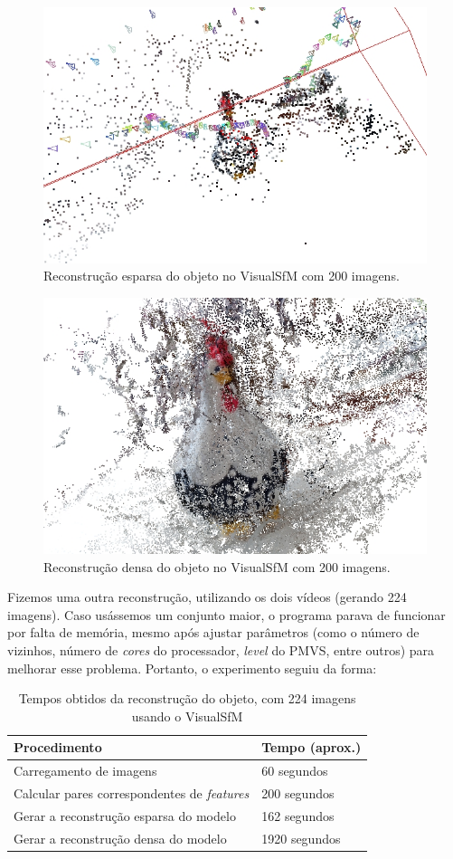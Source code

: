 \begin{figure}[!h]
	\centering
	\includegraphics[width=0.3\linewidth]{figs/galinhasparsa.jpg}
	\caption{%
	Reconstrução esparsa do objeto no VisualSfM com 200 imagens.
	}\label{fig:reconstrucaoEsparsaVisualSFM}
\end{figure}

\begin{figure}[!h]
	\centering
	\includegraphics[width=0.3\linewidth]{figs/galinhadense.jpg}
	\caption{%
	Reconstrução densa do objeto no VisualSfM com 200 imagens.
	}\label{fig:reconstrucaoDensaVisualSFM}
\end{figure}

Fizemos uma outra reconstrução, utilizando os dois vídeos (gerando 224 imagens). Caso usássemos um conjunto maior, o programa parava de funcionar por falta de memória, mesmo após ajustar parâmetros (como o número de vizinhos, número de \emph{cores} do processador, \emph{level} do PMVS, entre outros) para melhorar esse problema. Portanto, o experimento seguiu da forma:

\begin{table}[h!]
\caption{Tempos obtidos da reconstrução do objeto, com 224 imagens usando o VisualSfM}
\label{tab:temposSfM224}
\begin{tabular}{|l|p{4.7cm}|}
\hline
Procedimento & Tempo (aprox.) \\ \hline
Carregamento de imagens & 60 segundos \\ \hline
Calcular pares correspondentes de \emph{features} & 200 segundos \\ \hline
Gerar a reconstrução esparsa do modelo & 162 segundos \\ \hline
Gerar a reconstrução densa do modelo & 1920 segundos \\ \hline
\end{tabular}
\end{table}

